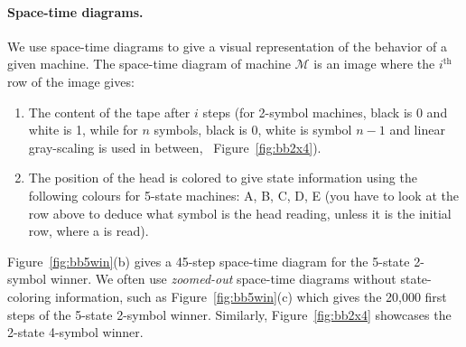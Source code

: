 \paragraph*{Space-time diagrams.} We use space-time diagrams to give a visual representation of the behavior of a given machine. The space-time diagram of machine $\mathcal{M}$ is an image where the $i^\text{th}$ row of the image gives:
\begin{enumerate}
    \item The content of the tape after $i$ steps (for 2-symbol machines, black is 0 and white is 1, while for $n$ symbols, black is 0, white is symbol $n-1$ and linear gray-scaling is used in between, \eg~Figure~\ref{fig:bb2x4}).
    \item The position of the head is colored to give state information using the following colours for 5-state machines: \textcolor{colorA}{A},  \textcolor{colorB}{B},  \textcolor{colorC}{C},  \textcolor{colorD}{D},  \textcolor{colorE}{E} (you have to look at the row above to deduce what symbol is the head reading, unless it is the initial row, where a \szero is read).
\end{enumerate}

Figure~\ref{fig:bb5win}(b) gives a 45-step space-time diagram for the 5-state 2-symbol \BBfull winner. We often use \textit{zoomed-out} space-time diagrams without state-coloring information, such as Figure~\ref{fig:bb5win}(c) which gives the 20,000 first steps of the 5-state 2-symbol \BBfull winner. Similarly, Figure~\ref{fig:bb2x4} showcases the 2-state 4-symbol \BBfull winner.


